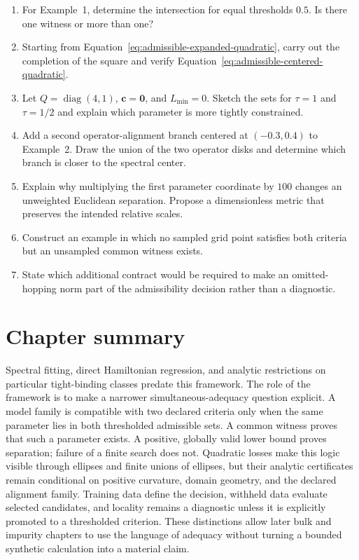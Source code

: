 \begin{enumerate}
  \item For Example~1, determine the intersection for equal thresholds $0.5$.
        Is there one witness or more than one?
  \item Starting from Equation~\eqref{eq:admissible-expanded-quadratic}, carry
        out the completion of the square and verify
        Equation~\eqref{eq:admissible-centered-quadratic}.
  \item Let $Q=\operatorname{diag}(4,1)$, $\mathbf c=\mathbf0$, and
        $L_{\min}=0$. Sketch the sets for $\tau=1$ and $\tau=1/2$ and explain
        which parameter is more tightly constrained.
  \item Add a second operator-alignment branch centered at $(-0.3,0.4)$ to
        Example~2. Draw the union of the two operator disks and determine which
        branch is closer to the spectral center.
  \item Explain why multiplying the first parameter coordinate by $100$
        changes an unweighted Euclidean separation. Propose a dimensionless
        metric that preserves the intended relative scales.
  \item Construct an example in which no sampled grid point satisfies both
        criteria but an unsampled common witness exists.
  \item State which additional contract would be required to make an
        omitted-hopping norm part of the admissibility decision rather than a
        diagnostic.
\end{enumerate}

\section{Chapter summary}

Spectral fitting, direct Hamiltonian regression, and analytic restrictions on
particular tight-binding classes predate this framework. The role of the
framework is to make a narrower simultaneous-adequacy question explicit.
A model family is compatible with two declared criteria only when the same
parameter lies in both thresholded admissible sets. A common witness proves
that such a parameter exists. A positive, globally valid lower bound proves
separation; failure of a finite search does not. Quadratic losses make this
logic visible through ellipses and finite unions of ellipses, but their analytic
certificates remain conditional on positive curvature, domain geometry, and
the declared alignment family. Training data define the decision, withheld
data evaluate selected candidates, and locality remains a diagnostic unless it
is explicitly promoted to a thresholded criterion. These distinctions allow
later bulk and impurity chapters to use the language of adequacy without
turning a bounded synthetic calculation into a material claim.
